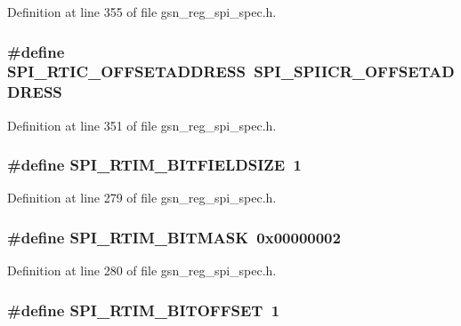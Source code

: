 Definition at line 355 of file gsn\_\-reg\_\-spi\_\-spec.h.

\hypertarget{a00573_a7d47b349a24ce05c845fb04cc2cc2308}{
\subsubsection[{SPI\_\-RTIC\_\-OFFSETADDRESS}]{\setlength{\rightskip}{0pt plus 5cm}\#define SPI\_\-RTIC\_\-OFFSETADDRESS~SPI\_\-SPIICR\_\-OFFSETADDRESS}}
\label{a00573_a7d47b349a24ce05c845fb04cc2cc2308}


Definition at line 351 of file gsn\_\-reg\_\-spi\_\-spec.h.

\hypertarget{a00573_adfad177bc729a0975fdb631ae02af240}{
\subsubsection[{SPI\_\-RTIM\_\-BITFIELDSIZE}]{\setlength{\rightskip}{0pt plus 5cm}\#define SPI\_\-RTIM\_\-BITFIELDSIZE~1}}
\label{a00573_adfad177bc729a0975fdb631ae02af240}


Definition at line 279 of file gsn\_\-reg\_\-spi\_\-spec.h.

\hypertarget{a00573_a226360e8192363369a8ad546547f9a1f}{
\subsubsection[{SPI\_\-RTIM\_\-BITMASK}]{\setlength{\rightskip}{0pt plus 5cm}\#define SPI\_\-RTIM\_\-BITMASK~0x00000002}}
\label{a00573_a226360e8192363369a8ad546547f9a1f}


Definition at line 280 of file gsn\_\-reg\_\-spi\_\-spec.h.

\hypertarget{a00573_a7f4d8d63d09526adbda13a3bf76a10ec}{
\subsubsection[{SPI\_\-RTIM\_\-BITOFFSET}]{\setlength{\rightskip}{0pt plus 5cm}\#define SPI\_\-RTIM\_\-BITOFFSET~1}}
\label{a00573_a7f4d8d63d09526adbda13a3bf76a10ec}


